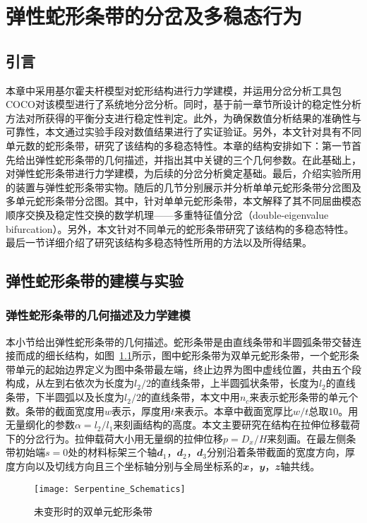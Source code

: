 
\chapter{弹性蛇形条带的分岔及多稳态行为}
\section{引言}
本章中采用基尔霍夫杆模型对蛇形结构进行力学建模，并运用分岔分析工具包COCO对该模型进行了系统地分岔分析。同时，基于前一章节所设计的稳定性分析方法对所获得的平衡分支进行稳定性判定。此外，为确保数值分析结果的准确性与可靠性，本文通过实验手段对数值结果进行了实证验证。另外，本文针对具有不同单元数的蛇形条带，研究了该结构的多稳态特性。本章的结构安排如下：第一节首先给出弹性蛇形条带的几何描述，并指出其中关键的三个几何参数。在此基础上，对弹性蛇形条带进行力学建模，为后续的分岔分析奠定基础。最后，介绍实验所用的装置与弹性蛇形条带实物。随后的几节分别展示并分析单单元蛇形条带分岔图及多单元蛇形条带分岔图。其中，针对单单元蛇形条带，本文解释了其不同屈曲模态顺序交换及稳定性交换的数学机理——多重特征值分岔（double-eigenvalue bifurcation）。另外，本文针对不同单元的蛇形条带研究了该结构的多稳态特性。最后一节详细介绍了研究该结构多稳态特性所用的方法以及所得结果。
\section{弹性蛇形条带的建模与实验}
\subsection{弹性蛇形条带的几何描述及力学建模}
本小节给出弹性蛇形条带的几何描述。蛇形条带是由直线条带和半圆弧条带交替连接而成的细长结构，如图~\ref{fig:Serpentine_Schematics}所示，图中蛇形条带为双单元蛇形条带，一个蛇形条带单元的起始边界定义为图中条带最左端，终止边界为图中虚线位置，共由五个段构成，从左到右依次为长度为$l_2/2$的直线条带，上半圆弧状条带，长度为$l_2$的直线条带，下半圆弧以及长度为$l_2/2$的直线条带，本文中用$n_c$来表示蛇形条带的单元个数。条带的截面宽度用$w$表示，厚度用$t$来表示。本章中截面宽厚比$w/t$总取$10$。用无量纲化的参数$\alpha=l_2/l_1$来刻画结构的高度。本文主要研究在结构在拉伸位移载荷下的分岔行为。拉伸载荷大小用无量纲的拉伸位移$p=D_x/H$来刻画。在最左侧条带初始端$s=0$处的材料标架三个轴$\mathbfit{d}_1$，$\mathbfit{d}_2$，$\mathbfit{d}_3$分别沿着条带截面的宽度方向，厚度方向以及切线方向且三个坐标轴分别与全局坐标系的$\mathbfit{x}$，$\mathbfit{y}$，$\mathbfit{z}$轴共线。
\begin{figure}
	\centering
	\texttt{[image: Serpentine\_Schematics]}
	\caption{未变形时的双单元蛇形条带}
	\label{fig:Serpentine_Schematics}
\end{figure}

